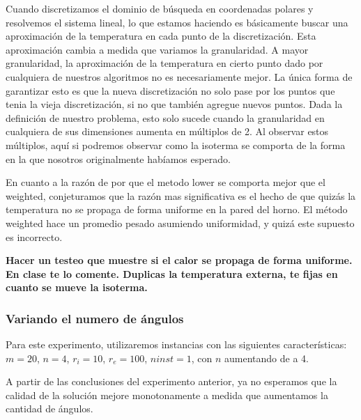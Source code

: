 Cuando discretizamos el dominio de búsqueda en coordenadas polares y resolvemos el sistema lineal, lo que estamos haciendo es básicamente buscar una aproximación de la temperatura en cada punto de la discretización. Esta aproximación cambia a medida que variamos la granularidad. A mayor granularidad, la aproximación de la temperatura en cierto punto dado por cualquiera de nuestros algoritmos no es necesariamente mejor. La única forma de garantizar esto es que la nueva discretización no solo pase por los puntos que tenia la vieja discretización, si no que también agregue nuevos puntos. Dada la definición de nuestro problema, esto solo sucede cuando la granularidad en cualquiera de sus dimensiones aumenta en múltiplos de 2. Al observar estos múltiplos, aquí si podremos observar como la isoterma se comporta de la forma en la que nosotros originalmente habíamos esperado.

En cuanto a la razón de por que el metodo lower se comporta mejor que el weighted, conjeturamos que la razón mas significativa es el hecho de que quizás la temperatura no se propaga de forma uniforme en la pared del horno. El método weighted hace un promedio pesado asumiendo uniformidad, y quizá este supuesto es incorrecto.

\textbf{Hacer un testeo que muestre si el calor se propaga de forma uniforme. En clase te lo comente. Duplicas la temperatura externa, te fijas en cuanto se mueve la isoterma.}

\pagebreak

\subsubsection{Variando el numero de ángulos}

Para este experimento, utilizaremos instancias con las siguientes características: $m = 20$, $n = 4$, $r_i = 10$, $r_e = 100$, $ninst = 1$, con $n$ aumentando de a 4.

A partir de las conclusiones del experimento anterior, ya no esperamos que la calidad de la solución mejore monotonamente a medida que aumentamos la cantidad de ángulos.

